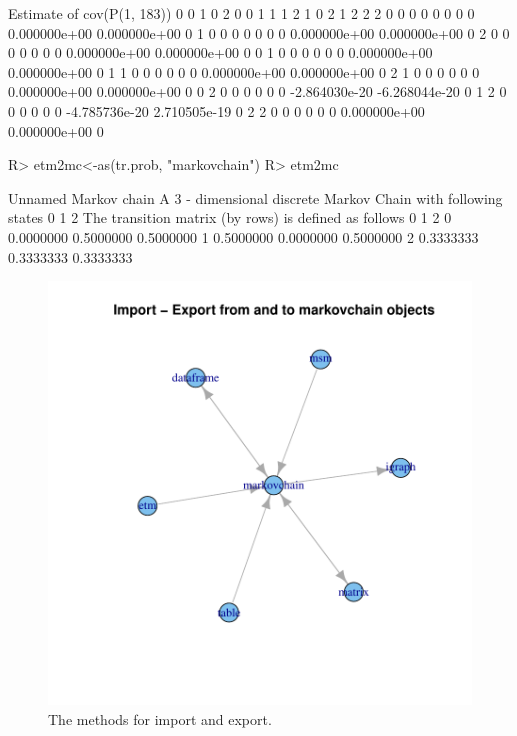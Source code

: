 \documentclass[nojss]{jss}
\begin{document}
\begin{Schunk}
\begin{Soutput}
Estimate of cov(P(1, 183))
    0 0 1 0 2 0 0 1 1 1 2 1           0 2           1 2 2 2
0 0   0   0   0   0   0   0  0.000000e+00  0.000000e+00   0
1 0   0   0   0   0   0   0  0.000000e+00  0.000000e+00   0
2 0   0   0   0   0   0   0  0.000000e+00  0.000000e+00   0
0 1   0   0   0   0   0   0  0.000000e+00  0.000000e+00   0
1 1   0   0   0   0   0   0  0.000000e+00  0.000000e+00   0
2 1   0   0   0   0   0   0  0.000000e+00  0.000000e+00   0
0 2   0   0   0   0   0   0 -2.864030e-20 -6.268044e-20   0
1 2   0   0   0   0   0   0 -4.785736e-20  2.710505e-19   0
2 2   0   0   0   0   0   0  0.000000e+00  0.000000e+00   0
\end{Soutput}
\begin{Sinput}
R> etm2mc<-as(tr.prob, "markovchain")
R> etm2mc
\end{Sinput}
\begin{Soutput}
Unnamed Markov chain 
 A  3 - dimensional discrete Markov Chain with following states 
 0 1 2 
 The transition matrix   (by rows)  is defined as follows 
          0         1         2
0 0.0000000 0.5000000 0.5000000
1 0.5000000 0.0000000 0.5000000
2 0.3333333 0.3333333 0.3333333
\end{Soutput}
\end{Schunk}

\begin{figure}
\begin{center}
\includegraphics{an_introduction_to_markovchain_package-importExportPlot}
\caption{The  methods for import and export.}
\label{fig:fromAndTo}
\end{center}
\end{figure}
\end{document}
